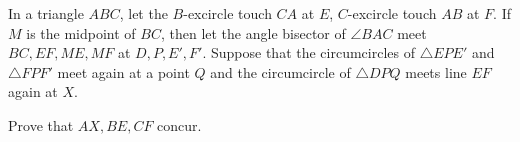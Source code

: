 In a triangle $ABC$, let the $B$-excircle touch $CA$ at $E$, $C$-excircle touch $AB$ at $F$. If $M$ is the midpoint of $BC$, then let the angle bisector of $\angle{BAC}$ meet $BC,EF,ME,MF$ at $D,P,E',F'$. Suppose that the circumcircles of $\triangle{EPE'}$ and $\triangle{FPF'}$ meet again at a point $Q$ and the circumcircle of $\triangle{DPQ}$ meets line $EF$ again at $X$.

Prove that $AX,BE,CF$ concur.
